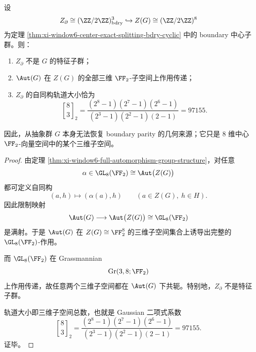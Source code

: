 \begin{theorem}\label{thm:xi-window6-boundary-center-nonintrinsic-orbit}
设
\[
Z_{\partial}\cong (\ZZ/2\ZZ)^3_{\mathrm{bdry}}
\hookrightarrow
Z(G)\cong (\ZZ/2\ZZ)^8
\]
为定理 \ref{thm:xi-window6-center-exact-splitting-bdry-cyclic} 中的 boundary 中心子群。则：
\begin{enumerate}
  \item \(Z_{\partial}\) 不是 \(G\) 的特征子群；
  \item \(\Aut(G)\) 在 \(Z(G)\) 的全部三维 \(\FF_2\)-子空间上作用传递；
  \item \(Z_{\partial}\) 的自同构轨道大小恰为
  \[
  \boxed{\;
  \genfrac{[}{]}{0pt}{}{8}{3}_{2}
  =
  \frac{(2^8-1)(2^7-1)(2^6-1)}{(2^3-1)(2^2-1)(2-1)}
  =97155.\;}
  \]
\end{enumerate}
因此，从抽象群 \(G\) 本身无法恢复 boundary parity 的几何来源；它只是 \(8\) 维中心 \(\FF_2\)-向量空间中的某个三维子空间。
\end{theorem}
\begin{proof}
由定理 \ref{thm:xi-window6-full-automorphism-group-structure}，对任意
\[
\alpha\in \GL_8(\FF_2)\cong \Aut\bigl(Z(G)\bigr)
\]
都可定义自同构
\[
(a,h)\longmapsto (\alpha(a),h)
\qquad (a\in Z(G),\ h\in H).
\]
因此限制映射
\[
\Aut(G)\longrightarrow \Aut\bigl(Z(G)\bigr)\cong \GL_8(\FF_2)
\]
是满射。于是 \(\Aut(G)\) 在 \(Z(G)\cong \FF_2^8\) 的三维子空间集合上诱导出完整的 \(\GL_8(\FF_2)\)-作用。

而 \(\GL_8(\FF_2)\) 在 Grassmannian
\[
\mathrm{Gr}(3,8;\FF_2)
\]
上作用传递，故任意两个三维子空间都在 \(\Aut(G)\) 下共轭。特别地，\(Z_{\partial}\) 不是特征子群。

轨道大小即三维子空间总数，也就是 Gaussian 二项式系数
\[
\genfrac{[}{]}{0pt}{}{8}{3}_{2}
=
\frac{(2^8-1)(2^7-1)(2^6-1)}{(2^3-1)(2^2-1)(2-1)}
=97155.
\]
证毕。
\end{proof}

